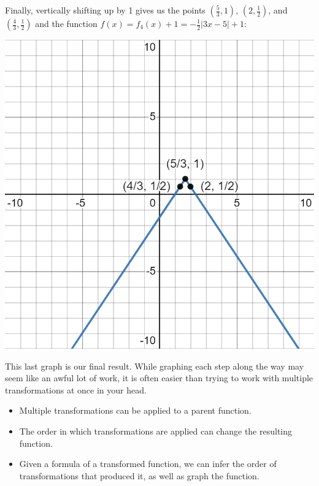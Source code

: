 \documentclass[handout, noauthor, nooutcomes]{ximera}
\begin{document}
\begin{example}
\begin{explanation}
Finally, vertically shifting up by 1 gives us the points $\left(\frac{5}{3}, 1\right)$, $\left(2, \frac{1}{2}\right)$, and $\left(\frac{4}{3}, \frac{1}{2}\right)$ and the function $f(x) = f_4(x)+ 1 = -\frac{1}{2}|3x - 5| + 1$:

\includegraphics[width=1\linewidth]{images/exgraph6.png}

This last graph is our final result. While graphing each step along the way may seem like an awful lot of work, it is often easier than trying to work with multiple transformations at once in your head. 
\end{explanation}
\end{example}






\begin{summary}\begin{itemize}
\item Multiple transformations can be applied to a parent function.
\item The order in which transformations are applied can change the resulting function.
\item Given a formula of a transformed function, we can infer the order of transformations that produced it, as well as graph the function. 
\end{itemize}\end{summary}
\end{document}
